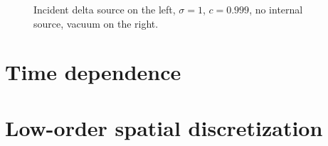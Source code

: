 \clearpage
\begin{figure}[htb]
  \centering
  \hspace{-.6in}
  \hspace{-.2in}
  \hspace{-.6in}
  \caption{Incident delta source on the left, $\sigma=1$,
  $c=0.999$, no internal source, vacuum on the right.}
  \label{fig:bndycondSolutions}
\end{figure}


\section{Time dependence}

\section{Low-order spatial discretization}

